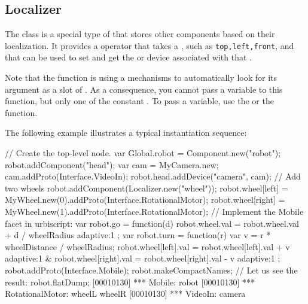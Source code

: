 \subsection{Localizer}

The  class is a special type of  that stores
other components based on their localization. It provides a \code{[]} operator
that takes a , such as \lstinline|top,left,front|, and that
can be used to set and get the  or device associated with
that .

Note that the \code{[]} function is using a mechanisms to automatically look
for its argument as a slot of . As a consequence, you cannot
pass a variable to this function, but only one of the constant
.
To pass a variable, use the  or the 
function.

The following example illustrates a typical instantiation sequence:

\begin{urbiunchecked}
// Create the top-level node.
var Global.robot = Component.new("robot");
robot.addComponent("head");
var cam = MyCamera.new;
cam.addProto(Interface.VideoIn);
robot.head.addDevice("camera", cam);
// Add two wheels
robot.addComponent(Localizer.new("wheel"));
robot.wheel[left] = MyWheel.new(0).addProto(Interface.RotationalMotor);
robot.wheel[right] = MyWheel.new(1).addProto(Interface.RotationalMotor);
// Implement the Mobile facet in urbiscript:
var robot.go = function(d)
{
  robot.wheel.val = robot.wheel.val + d / wheelRadius adaptive:1
};
var robot.turn = function(r)
{
  var v = r * wheelDistance / wheelRadius;
  robot.wheel[left].val = robot.wheel[left].val + v adaptive:1 &
  robot.wheel[right].val = robot.wheel[right].val - v adaptive:1
};
robot.addProto(Interface.Mobile);
robot.makeCompactNames;
// Let us see the result:
robot.flatDump;
[00010130] *** Mobile: robot
[00010130] *** RotationalMotor: wheelL wheelR
[00010130] *** VideoIn: camera
\end{urbiunchecked}


